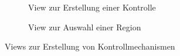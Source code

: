 \documentclass[notables, nomenclature, oneside, 150]{HSMW-Thesis}
\begin{document}
\begin{figure}[th]
\begin{subfigure}[t]{0.3\textwidth}
        			\caption{View zur Erstellung einer Kontrolle}
        			\label{fig:l2}
    			\end{subfigure}
    			\begin{subfigure}[t]{0.3\textwidth}
        			\caption{View zur Auswahl einer Region}
        			\label{fig:l3}
    			\end{subfigure}
    			\caption{Views zur Erstellung von Kontrollmechanismen}
				\label{fig:link1}
			\end{figure}
	
\end{document}
